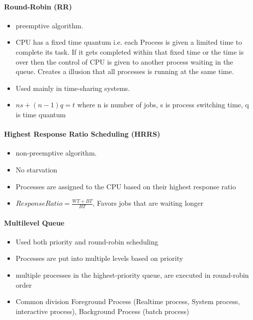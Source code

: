 \paragraph{Round-Robin (RR)}
\begin{itemize}
	\item preemptive algorithm. 
	\item CPU has a fixed time quantum i.e. each Process is given a limited time to complete its task. If it gets completed within that fixed time or the time is over then the control of CPU is given to another process waiting in the queue. Creates a illusion that all processes is running at the same time.
	\item Used mainly in time-sharing systems.
	\item $ns + (n-1)q = t$ where n is number of jobs, s is process switching time, q is time quantum
\end{itemize}
\paragraph{Highest Response Ratio Scheduling (HRRS)}
\begin{itemize}
    \item non-preemptive algorithm.
    \item No starvation
    \item Processes are assigned to the CPU based on their highest response ratio
    \item $ResponseRatio=\frac{WT+BT}{BT}$, Favors jobs that are waiting longer    
    
\end{itemize}
\paragraph{Multilevel Queue}
\begin{itemize}
	\item Used both priority and round-robin scheduling
    \item Processes are put into multiple levels based on priority
    \item multiple processes in the highest-priority queue, are executed in round-robin order
    \item Common division Foreground Process (Realtime process, System process, interactive process), Background Process (batch process)
\end{itemize}
